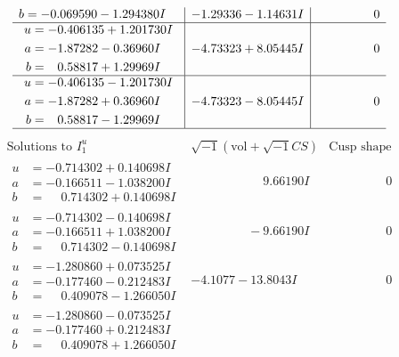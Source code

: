\documentclass[1p]{elsarticle_modified}
\theoremstyle{definition}
\newcommand{\I}{\sqrt{-1}}
\begin{document}
$$\begin{array}{c|c|c}
\begin{aligned}
b &= -0.069590 - 1.294380 I\end{aligned}
 & -1.29336 - 1.14631 I & \phantom{-0.000000 } 0 \\ \hline\begin{aligned}
u &= -0.406135 + 1.201730 I \\
a &= -1.87282 - 0.36960 I \\
b &= \phantom{-}0.58817 + 1.29969 I\end{aligned}
 & -4.73323 + 8.05445 I & \phantom{-0.000000 } 0 \\ \hline\begin{aligned}
u &= -0.406135 - 1.201730 I \\
a &= -1.87282 + 0.36960 I \\
b &= \phantom{-}0.58817 - 1.29969 I\end{aligned}
 & -4.73323 - 8.05445 I & \phantom{-0.000000 } 0\\
 \hline 
 \end{array}$$\newpage$$\begin{array}{c|c|c}  
\text{Solutions to }I^u_{1}& \I (\text{vol} + \sqrt{-1}CS) & \text{Cusp shape}\\
 \hline 
\begin{aligned}
u &= -0.714302 + 0.140698 I \\
a &= -0.166511 - 1.038200 I \\
b &= \phantom{-}0.714302 + 0.140698 I\end{aligned}
 & \phantom{-0.000000 -}9.66190 I & \phantom{-0.000000 } 0 \\ \hline\begin{aligned}
u &= -0.714302 - 0.140698 I \\
a &= -0.166511 + 1.038200 I \\
b &= \phantom{-}0.714302 - 0.140698 I\end{aligned}
 & \phantom{-0.000000 } -9.66190 I & \phantom{-0.000000 } 0 \\ \hline\begin{aligned}
u &= -1.280860 + 0.073525 I \\
a &= -0.177460 - 0.212483 I \\
b &= \phantom{-}0.409078 - 1.266050 I\end{aligned}
 & -4.1077 - 13.8043 I & \phantom{-0.000000 } 0 \\ \hline\begin{aligned}
u &= -1.280860 - 0.073525 I \\
a &= -0.177460 + 0.212483 I \\
b &= \phantom{-}0.409078 + 1.266050 I\end{aligned}

\end{array}$$
\end{document}

